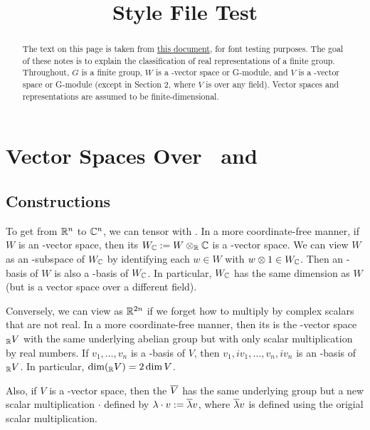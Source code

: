 \documentclass{scrartcl}
\title{Style File Test}
\begin{document}
\maketitle

\begin{abstract}
The text on this page is taken from \href{http://www-math.mit.edu/~poonen/715/real_representations.pdf}{this document}, for font testing purposes. The goal of these notes is to explain the classification of real representations of a finite
group. Throughout, $G$ is a finite group, $W$ is a \RR-vector space or \RR G-module, and $V$ is a
\CC-vector space or \CC G-module (except in Section 2, where $V$ is over any field). Vector spaces
and representations are assumed to be finite-dimensional.

\end{abstract}

\section{Vector Spaces Over \RR\ and \CC}
\subsection{Constructions}
To get from $\mathbb R^n$ to $\mathbb C^n$, we can tensor with \CC. In a more coordinate-free
manner, if $W$ is an \RR-vector space, then its  $W_{\mathbb C} := W \otimes_{\mathbb R} \mathbb C$ is a \CC-vector
space. We can view $W$ as an \RR-subspace of $W_{\mathbb C}$ by identifying each $w \in W$ with $w \otimes 1 \in W_{\mathbb C}$.
Then an \RR-basis of $W$ is also a \CC-basis of $W_{\mathbb C}$. In particular, $W_{\mathbb C}$ has the same dimension as
$W$ (but is a vector space over a different field).

Conversely, we can view \CCn as $\mathbb R^{2n}$ if we forget how to multiply by complex scalars that are not real. In a more coordinate-free manner, then its  is the \RR-vector space $_{\mathbb R} V$ with the same underlying abelian group but with only scalar multiplication by real numbers. If $v_1,\dots,v_n$ is a \CC-basis of $V$, then $v_1, iv_1,\dots,v_n,iv_n$ is an \RR-basis of $_{\mathbb R} V$. In particular, $\dim(_{\mathbb R} V) = 2\dim V$.

Also, if $V$ is a \CC-vector space, then the  $\overline{V}$ has the same underlying group but a new scalar multiplication $\cdot$ defined by $\lambda\cdot v := \overline{\lambda}v$, where $\overline{\lambda}v$ is defined using the origial scalar multiplication.
\end{document}
